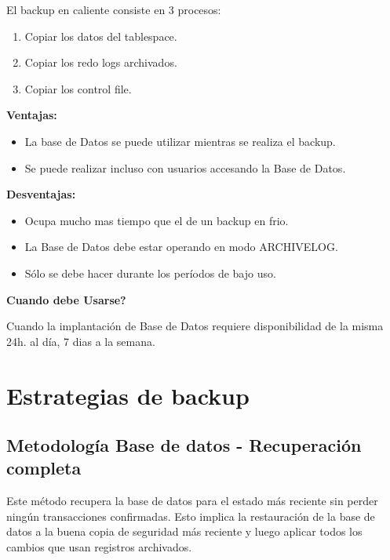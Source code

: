 El backup en caliente consiste en 3 procesos:

\begin{enumerate}
\item Copiar los datos del tablespace.
\item Copiar los redo logs archivados.
\item Copiar los control file.
\end{enumerate}

\textbf{Ventajas:}
\begin{itemize}
\item La base de Datos se puede utilizar mientras se realiza el backup.
\item Se puede realizar incluso con usuarios accesando la Base de Datos.
\end{itemize}

\textbf{Desventajas:}
\begin{itemize}
\item Ocupa mucho mas tiempo que el de un backup en frio.
\item La Base de Datos debe estar operando en modo ARCHIVELOG.
\item Sólo se debe hacer durante los períodos de bajo uso.
\end{itemize}

\textbf{Cuando debe Usarse?}

Cuando la implantación de Base de Datos requiere disponibilidad de la misma 24h. al
día, 7 dias a la semana.

\section{Estrategias de backup}

\subsection{Metodología Base de datos - Recuperación completa}

Este método recupera la base de datos para el estado más reciente sin perder ningún transacciones confirmadas. Esto implica la restauración de la base de datos a la buena copia de seguridad más reciente y luego aplicar todos los cambios que usan registros archivados.

